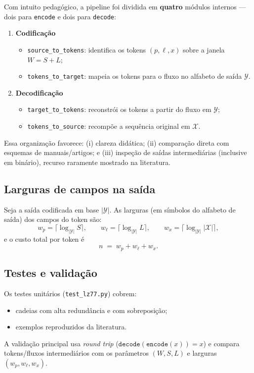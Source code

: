 Com intuito pedagógico, a pipeline foi dividida em \textbf{quatro} módulos
internos — dois para \texttt{encode} e dois para \texttt{decode}:
\begin{enumerate}
    \item \textbf{Codificação}
          \begin{itemize}
              \item \texttt{source\_to\_tokens}: identifica os tokens \((p,\ell,x)\) sobre a janela \(W=S+L\);
              \item \texttt{tokens\_to\_target}: mapeia os tokens para o fluxo no alfabeto de saída \(\mathcal{Y}\).
          \end{itemize}
    \item \textbf{Decodificação}
          \begin{itemize}
              \item \texttt{target\_to\_tokens}: reconstrói os tokens a partir do fluxo em \(\mathcal{Y}\);
              \item \texttt{tokens\_to\_source}: recompõe a sequência original em \(\mathcal{X}\).
          \end{itemize}
\end{enumerate}

Essa organização favorece: (i) clareza didática; (ii) comparação direta com
esquemas de manuais/artigos; e (iii) inspeção de saídas intermediárias
(inclusive em binário), recurso raramente mostrado na literatura.

\subsection{Larguras de campos na saída}\label{subsec:larguras}

Seja a saída codificada em base \( |\mathcal{Y}| \). As larguras (em símbolos
do alfabeto de saída) dos campos do token são:
\[
    w_p = \big\lceil \log_{|\mathcal{Y}|} S \big\rceil,\qquad
    w_\ell = \big\lceil \log_{|\mathcal{Y}|} L \big\rceil,\qquad
    w_x = \big\lceil \log_{|\mathcal{Y}|} |\mathcal{X}| \big\rceil,
\]
e o custo total por token é
\[
    n \;=\; w_p + w_\ell + w_x.
\]

\subsection{Testes e validação}\label{subsec:testes}

Os testes unitários (\texttt{test\_lz77.py}) cobrem:
\begin{itemize}
    \item cadeias com alta redundância e com sobreposição;
    \item exemplos reproduzidos da literatura.
\end{itemize}
A validação principal usa \textit{round trip} (\(\texttt{decode}(\texttt{encode}(x)) = x\)) e compara tokens/fluxos intermediários com os parâmetros \((W,S,L)\) e larguras \((w_p,w_\ell,w_x)\).


